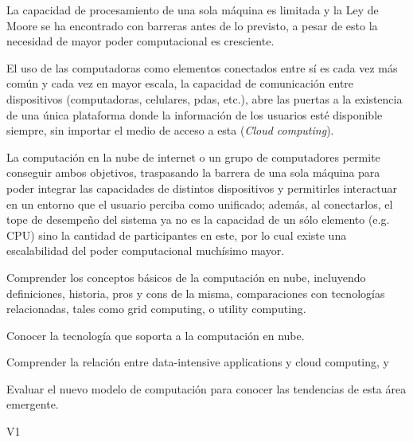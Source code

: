 \begin{syllabus}


\begin{justification}
La capacidad de procesamiento de una sola máquina es limitada y la Ley de Moore se ha encontrado 
con barreras antes de lo previsto, a pesar de esto la necesidad de mayor poder computacional es cresciente. 

El uso de las computadoras como elementos conectados entre sí­ es cada vez más común y cada vez en mayor escala, 
la capacidad de comunicación entre dispositivos (computadoras, celulares, pdas, etc.), abre las puertas 
a la existencia de una única plataforma donde la información de los usuarios
esté disponible siempre, sin importar el medio de acceso a esta (\textit{Cloud computing}).

La computación en la nube de internet o un grupo de computadores 
permite conseguir ambos objetivos, traspasando la barrera de una sola máquina para poder
integrar las capacidades de distintos dispositivos y permitirles interactuar en un entorno que
el usuario perciba como unificado; además, al conectarlos, el tope de desempeño
del sistema ya no es la capacidad de un sólo elemento (e.g. CPU) sino la cantidad de participantes en este,
por lo cual existe una escalabilidad del poder computacional muchísimo mayor.
\end{justification}

\begin{goals}
\item Comprender los conceptos básicos de la computación en nube, incluyendo definiciones, historia, pros y cons de la misma, comparaciones con tecnologías relacionadas, tales como grid computing, o utility computing.
\item Conocer la tecnología que soporta a la computación en nube.
\item Comprender la relación entre data-intensive applications y cloud computing, y
\item Evaluar el nuevo modelo de computación para conocer las tendencias de esta área emergente.
\end{goals}

\begin{outcomes}{V1}
\end{outcomes}


\end{syllabus}
